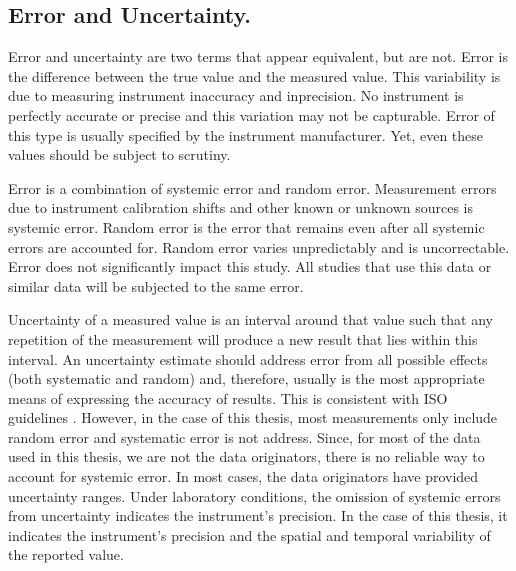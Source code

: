 \begin{linenumbers}
\section*{Error and Uncertainty.}
\label{sec:ErrorAndUncertainty}

Error and uncertainty are two terms that appear equivalent, but are not.  Error is the difference between the true value and the measured value.  This variability is due to measuring instrument inaccuracy and inprecision.  No instrument is perfectly accurate or precise and this variation may not be capturable.  Error of this type is usually specified by the instrument manufacturer.  Yet, even these values should be subject to scrutiny.

Error is a combination of systemic error and random error.  Measurement errors due to instrument calibration shifts and other known or unknown sources is systemic error.  Random error is the error that remains even after all systemic errors are accounted for.  Random error varies unpredictably and is uncorrectable.  Error does not significantly impact this study.  All studies that use this data or similar data will be subjected to the same error.

Uncertainty of a measured value is an interval around that value such that any repetition of the measurement will produce a new result that lies within this interval.  An uncertainty estimate should address error from all possible effects (both systematic and random) and, therefore, usually is the most appropriate means of expressing the accuracy of results.  This is consistent with ISO guidelines .  However, in the case of this thesis, most measurements only include random error and systematic error is not address.  Since, for most of the data used in this thesis, we are not the data originators, there is no reliable way to account for systemic error.  In most cases, the data originators have provided uncertainty ranges.  Under laboratory conditions, the omission of systemic errors from uncertainty indicates the instrument's precision.  In the case of this thesis, it indicates the instrument's precision and the spatial and temporal variability of the reported value. 



\end{linenumbers}
